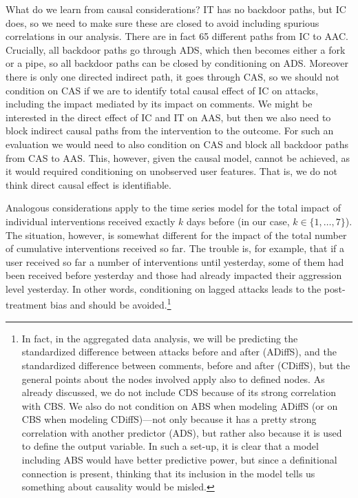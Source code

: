 \documentclass[preprint,12pt]{elsarticle}
\begin{document}
What do we learn from causal considerations? \textsf{IT} has no backdoor
paths, but \textsf{IC} does, so we need to make sure these are closed to
avoid including spurious correlations in our analysis. There are in fact
65 different paths from \textsf{IC} to \textsf{AAC}. Crucially, all
backdoor paths go through \textsf{ADS}, which then becomes either a fork
or a pipe, so all backdoor paths can be closed by conditioning on
\textsf{ADS}. Moreover there is only one directed indirect path, it goes
through \textsf{CAS}, so we should not condition on \textsf{CAS} if we
are to identify total causal effect of \textsf{IC} on attacks, including
the impact mediated by its impact on comments. We might be interested in
the direct effect of \textsf{IC} and \textsf{IT} on \textsf{AAS}, but
then we also need to block indirect causal paths from the intervention
to the outcome. For such an evaluation we would need to also condition
on \textsf{CAS} and block all backdoor paths from \textsf{CAS} to
\textsf{AAS}. This, however, given the causal model, cannot be achieved,
as it would required conditioning on unobserved user features. That is,
we do not think direct causal effect is identifiable.

Analogous considerations apply to the time series model for the total
impact of individual interventions received exactly \(k\) days before
(in our case, \(k\in \{1, \dots, 7\}\)). The situation, however, is
somewhat different for the impact of the total number of cumulative
interventions received so far. The trouble is, for example, that if a
user received so far a number of interventions until yesterday, some of
them had been received before yesterday and those had already impacted
their aggression level yesterday. In other words, conditioning on lagged
attacks leads to the post-treatment bias and should be
avoided.\footnote{In fact, in the aggregated data analysis, we will be predicting the standardized difference between attacks before and after (\textsf{ADiffS}), and the standardized difference between comments, before and after (\textsf{CDiffS}), but the general points about the nodes involved apply also to defined nodes.  As already discussed, we do not include \textsf{CDS} because of its strong correlation with \textsf{CBS}. We also do not condition on \textsf{ABS} when modeling \textsf{ADiffS} (or on \textsf{CBS} when modeling \textsf{CDiffS})---not only because it has a pretty strong correlation with another predictor (\textsf{ADS}), but rather also because it is used to define the output variable. In such a set-up, it is clear that a model including \textsf{ABS} would have better predictive power, but since a definitional connection is present, thinking that its inclusion in the model tells us something about causality  would be misled.}
\end{document}
